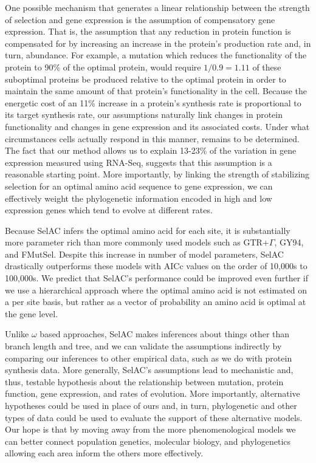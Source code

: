 \documentclass[12pt,letterpaper]{article}
\newcommand{\selac}{SelAC\xspace}
\begin{document}
One possible mechanism that generates a linear relationship between the strength of selection and gene expression is the assumption of compensatory gene expression.
That is, the assumption that any reduction in protein function is compensated for by increasing an increase in the protein's production rate and, in turn, abundance.
For example, a mutation which reduces the functionality of the protein to 90\% of the optimal protein, would require $1/0.9 = 1.11$ of these suboptimal proteins be produced relative to the optimal protein in order to maintain the same amount of that protein's functionality in the cell.
Because the energetic cost of an 11\% increase in a protein's synthesis rate is proportional to its target synthesis rate, our assumptions naturally link changes in protein functionality and changes in gene expression and its associated costs.
Under what circumstances cells actually respond in this manner, remains to be determined.
The fact that our method allows us to explain 13-23\% of the variation in gene expression measured using RNA-Seq, suggests that this assumption is a reasonable starting point.
More importantly, by linking the strength of stabilizing selection for an optimal amino acid sequence to gene expression, we can effectively weight the phylogenetic information encoded in high and low expression genes which tend to evolve at different rates.

Because \selac infers the optimal amino acid for each site, it is substantially more parameter rich than more commonly used models such as GTR$+\Gamma$, GY94, and FMutSel.
Despite this increase in number of model parameters, \selac drastically outperforms these models with AICc values on the order of 10,000s to 100,000s.
We predict that \selac's performance could be improved even further if we use a hierarchical approach where the optimal amino acid is not estimated on a per site basis, but rather as a vector of probability an amino acid is optimal at the gene level.

Unlike $\omega$ based approaches, \selac makes inferences about things other than branch length and tree, and we can validate the assumptions indirectly by comparing our inferences to other empirical data, such as we do with protein synthesis data.
More generally, \selac's assumptions lead to mechanistic and, thus, testable hypothesis about the relationship between mutation, protein function, gene expression, and rates of evolution.
More importantly, alternative hypotheses could be used in place of ours and, in turn, phylogenetic and other types of data could be used to evaluate the support of these alternative models.
Our hope is that by moving away from the more phenomenological models we can better connect population genetics, molecular biology, and phylogenetics allowing each area inform the others more effectively.
\end{document}
